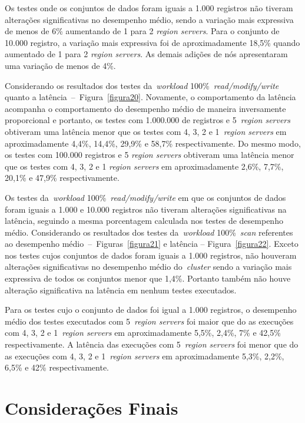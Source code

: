 \documentclass[12pt]{article}
\begin{document}
Os testes onde os conjuntos de dados foram iguais a 1.000 registros não tiveram alterações significativas no desempenho médio, sendo a variação mais expressiva de menos de 6\% aumentando de 1 para 2 \emph{region servers}. Para o conjunto de 10.000 registro, a variação mais expressiva foi de aproximadamente 18,5\% quando aumentado de 1 para 2 \emph{region servers}. As demais adições de nós apresentaram uma variação de menos de 4\%.

Considerando os resultados dos testes da~\emph{workload} 100\%~\emph{read/modify/write} quanto a latência~--~Figura~\ref{figura20}. Novamente, o comportamento da latência acompanha o comportamento do desempenho médio de maneira inversamente proporcional e portanto, os testes com 1.000.000 de registros e 5~\emph{region servers} obtiveram uma latência menor que os testes com 4, 3, 2 e 1~\emph{region servers} em aproximadamente 4,4\%, 14,4\%, 29,9\% e 58,7\% respectivamente. Do mesmo modo, os testes com 100.000 registros e 5 \emph{region servers} obtiveram uma latência menor que os testes com 4, 3, 2 e 1 \emph{region servers} em aproximadamente 2,6\%, 7,7\%, 20,1\% e 47,9\% respectivamente.

Os testes da~\emph{workload} 100\%~\emph{read/modify/write} em que os conjuntos de dados foram iguais a 1.000 e 10.000 registros não tiveram alterações significativas na latência, seguindo a mesma porcentagem calculada nos testes de desempenho médio. Considerando os resultados dos testes da~\emph{workload} 100\%~\emph{scan} referentes ao desempenho médio~--~Figuras~\ref{figura21} e latência -- Figura~\ref{figura22}. Exceto nos testes cujos conjuntos de dados foram iguais a 1.000 registros, não houveram alterações significativas no desempenho médio do~\emph{cluster} sendo a variação mais expressiva de todos os conjuntos menor que 1,4\%. Portanto também não houve alteração significativa na latência em nenhum testes executados.

Para os testes cujo o conjunto de dados foi igual a 1.000 registros, o desempenho médio dos testes executados com 5~\emph{region servers} foi maior que do as execuções com 4, 3, 2 e 1~\emph{region servers} em aproximadamente 5,5\%, 2,4\%, 7\% e 42,5\% respectivamente. A latência das execuções com 5~\emph{region servers} foi menor que do as execuções com 4, 3, 2 e 1~\emph{region servers} em aproximadamente 5,3\%, 2,2\%, 6,5\% e 42\% respectivamente.

\section{Considerações Finais}
\label{sec:finais}
\end{document}
